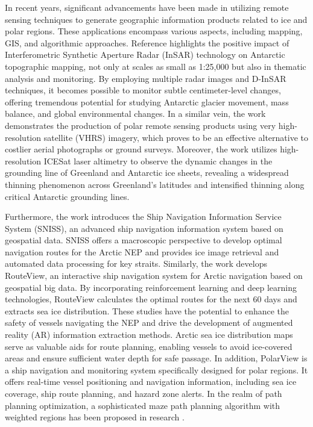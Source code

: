 In recent years, significant advancements have been made in utilizing remote sensing techniques to generate geographic information products related to ice and polar regions. These applications encompass various aspects, including mapping, GIS, and algorithmic approaches. Reference \cite{160zhou2004feasibility} highlights the positive impact of Interferometric Synthetic Aperture Radar (InSAR) technology on Antarctic topographic mapping, not only at scales as small as 1:25,000 but also in thematic analysis and monitoring. By employing multiple radar images and D-InSAR techniques, it becomes possible to monitor subtle centimeter-level changes, offering tremendous potential for studying Antarctic glacier movement, mass balance, and global environmental changes. In a similar vein, the work \cite{161kurczynski2017mapping} demonstrates the production of polar remote sensing products using very high-resolution satellite (VHRS) imagery, which proves to be an effective alternative to costlier aerial photographs or ground surveys. Moreover, the work  \cite{162pritchard2009extensive} utilizes high-resolution ICESat laser altimetry to observe the dynamic changes in the grounding line of Greenland and Antarctic ice sheets, revealing a widespread thinning phenomenon across Greenland's latitudes and intensified thinning along critical Antarctic grounding lines.

Furthermore, the work  \cite{168wu2022ship} introduces the Ship Navigation Information Service System (SNISS), an advanced ship navigation information system based on geospatial data. SNISS offers a macroscopic perspective to develop optimal navigation routes for the Arctic NEP and provides ice image retrieval and automated data processing for key straits. Similarly, the work \cite{169wu2022routeview} develops RouteView, an interactive ship navigation system for Arctic navigation based on geospatial big data. By incorporating reinforcement learning and deep learning technologies, RouteView calculates the optimal routes for the next 60 days and extracts sea ice distribution. These studies have the potential to enhance the safety of vessels navigating the NEP and drive the development of augmented reality (AR) information extraction methods. Arctic sea ice distribution maps serve as valuable aids for route planning, enabling vessels to avoid ice-covered areas and ensure sufficient water depth for safe passage. In addition, PolarView is a ship navigation and monitoring system specifically designed for polar regions. It offers real-time vessel positioning and navigation information, including sea ice coverage, ship route planning, and hazard zone alerts. In the realm of path planning optimization, a sophisticated maze path planning algorithm with weighted regions has been proposed in research \cite{167chang2015route}. 

